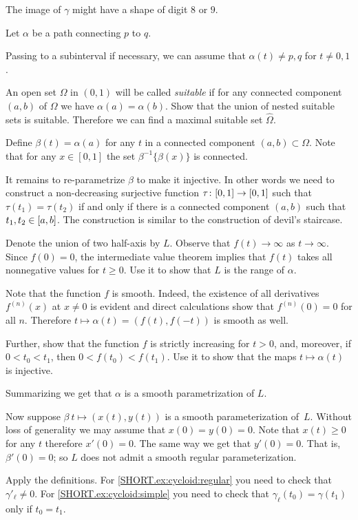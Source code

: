  The image of $\gamma$ might have a shape of digit $8$ or $9$.

Let $\alpha$ be a path connecting $p$ to $q$.

Passing to a subinterval if necessary,
we can assume that $\alpha(t)\ne p,q$ for $t\ne0,1$.

An open set $\Omega$ in $(0,1)$ will be called {}\emph{suitable}
if for any connected component $(a,b)$ of $\Omega$ we have $\alpha(a)=\alpha(b)$.
Show that the union of nested suitable sets is suitable.
Therefore we can find a maximal suitable set $\hat \Omega$.

Define $\beta(t)=\alpha(a)$ for any $t$ in a connected component $(a,b)\subset\Omega$.
Note that for any $x\in [0,1]$ the set $\beta^{-1}\{\beta(x)\}$ is connected.

It remains to re-parametrize $\beta$ to make it injective.
In other words we need to construct a non-decreasing surjective function $\tau\:[0,1]\z\to[0,1]$ such that 
$\tau(t_1)=\tau(t_2)$ if and only if there is a connected component $(a,b)$ such that $t_1,t_2\z\in [a,b]$.
The construction is similar to the construction of devil's staircase.


Denote the union of two half-axis by $L$.
Observe that $f(t)\to\infty$ as $t\to \infty$.
Since $f(0)=0$, the intermediate value theorem implies that $f(t)$ takes all nonnegative values for $t\ge 0$.
Use it to show that $L$ is the range of $\alpha$.

Note that the function $f$
is smooth.
Indeed, the existence of all derivatives $f^{(n)}(x)$ at $x\ne 0$ is evident and direct calculations show that $f^{(n)}(0)=0$ for all $n$.
Therefore $t\mapsto \alpha(t)=(f(t),f(-t))$ is smooth as well.

Further, show that the function $f$ is strictly increasing for $t> 0$,
and, moreover, if $0<t_0<t_1$, then $0<f(t_0)<f(t_1)$.
Use it to show that the maps $t\mapsto \alpha(t)$ is injective.

Summarizing we get that $\alpha$ is a smooth parametrization of $L$. 

Now suppose $\beta\:t\mapsto (x(t),y(t))$ is a smooth parameterization of~$L$.
Without loss of generality we may assume that $x(0)=y(0)=0$.
Note that $x(t)\ge 0$ for any $t$ therefore $x'(0)=0$.
The same way we get that $y'(0)=0$.
That is, $\beta'(0)=0$;
so $L$ does not admit a smooth regular parameterization.

Apply the definitions.
For \ref{SHORT.ex:cycloid:regular} you need to check that $\gamma'_\ell\ne 0$.
For \ref{SHORT.ex:cycloid:simple} you need to check that $\gamma_\ell(t_0)=\gamma(t_1)$ only if $t_0=t_1$.

